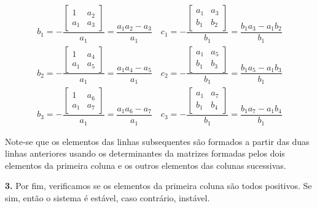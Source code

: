 $$
    \begin{aligned}
        b_1 = -\dfrac{\begin{bmatrix}
                        1 & a_2\\
                        a_1 & a_3        
                    \end{bmatrix}}{a_1} = \dfrac{a_1 a_2 - a_3}{a_1}\quad
        c_1 = -\dfrac{\begin{bmatrix}
                        a_1 & a_3\\
                        b_1 & b_2        
                    \end{bmatrix}}{b_1} = \dfrac{b_1 a_3 - a_1 b_2}{b_1}\\
        b_2 = -\dfrac{\begin{bmatrix}
                        1 & a_4\\
                        a_1 & a_5        
                    \end{bmatrix}}{a_1} = \dfrac{a_1 a_4 - a_5}{a_1}\quad
        c_2 = -\dfrac{\begin{bmatrix}
                        a_1 & a_5\\
                        b_1 & b_3        
                    \end{bmatrix}}{b_1} = \dfrac{b_1 a_5 - a_1 b_3}{b_1}\\
        b_3 = -\dfrac{\begin{bmatrix}
                        1 & a_6\\
                        a_1 & a_7        
                    \end{bmatrix}}{a_1} = \dfrac{a_1 a_6 - a_7}{a_1}\quad
        c_3 = -\dfrac{\begin{bmatrix}
                        a_1 & a_7\\
                        b_1 & b_4        
                    \end{bmatrix}}{b_1} = \dfrac{b_1 a_7 - a_1 b_4}{b_1}
    \end{aligned}
$$

\noindent Note-se que os elementos das linhas subsequentes são formados a partir das duas linhas anteriores usando os determinantes da matrizes formadas pelos dois elementos da primeira coluna e os outros elementos das colunas sucessivas.

\vspace{1 em}
\noindent\textbf{3.} Por fim, verificamos se os elementos da primeira coluna são todos positivos. Se sim, então o sistema é estável, caso contrário, instável.
